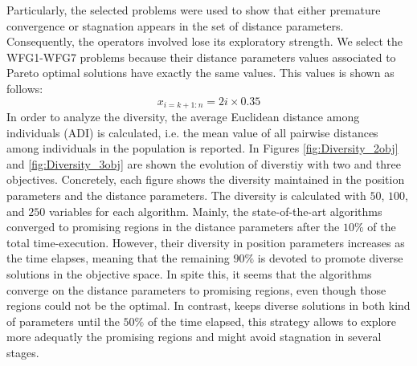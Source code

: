 %
Particularly, the selected problems were used to show that either premature convergence or stagnation appears in the set of distance parameters.
%
Consequently, the operators involved lose its exploratory strength.
%
We select the WFG1-WFG7 problems because their distance parameters values associated to Pareto optimal solutions have exactly the same values.
%
This values is shown as follows:
\begin{equation}
   x_{i=k+1:n} = 2i \times 0.35
\end{equation}
%
%
In order to analyze the diversity, the average Euclidean distance among individuals (ADI) is calculated, i.e. the mean value of all pairwise distances among individuals in the population is reported.
%
In Figures \ref{fig:Diversity_2obj} and \ref{fig:Diversity_3obj} are shown the evolution of diverstiy with two and three objectives.
%
Concretely, each figure shows the diversity maintained in the position parameters and the distance parameters.
%
The diversity is calculated with $50$, $100$, and $250$ variables for each algorithm.
%
Mainly, the state-of-the-art algorithms converged to promising regions in the distance parameters after the $10\%$ of the total time-execution.
%
However, their diversity in position parameters increases as the time elapses, meaning that the remaining $90\%$ is devoted to promote diverse solutions in the objective space.
%
In spite this, it seems that the algorithms converge on the distance parameters to promising regions, even though those regions could not be the optimal.
%
In contrast, \VSDMOEA{} keeps diverse solutions in both kind of parameters until the $50\%$ of the time elapsed, this strategy allows to explore more adequatly the promising regions and might avoid stagnation in several stages.
%
